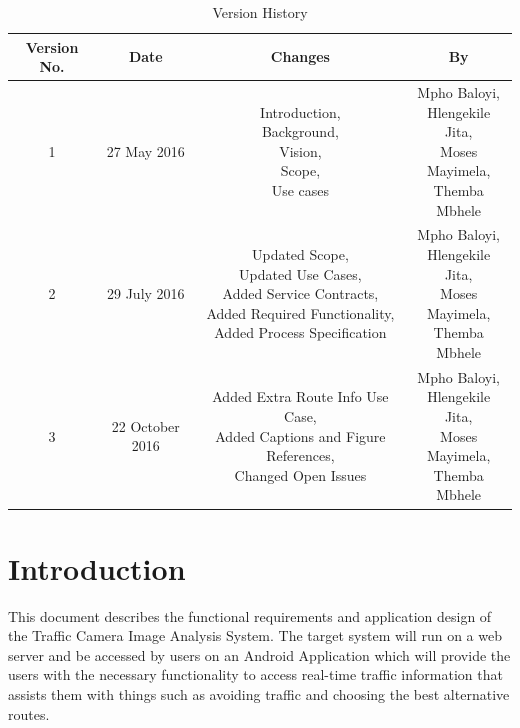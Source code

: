 \documentclass[a4paper,12pt]{article}
\begin{document}
\newpage
\tableofcontents
\newpage

\newpage
\begin{table}[ht]
 \centering
 \caption{Version History}
 \label{tab:table1}
 \begin{tabular}{cccc}
   \toprule Version No. & Date & Changes & By\\
   \midrule 1 & 27 May 2016 & \makecell {Introduction,\\ Background,\\ Vision,\\ Scope,\\ Use cases} & \makecell {Mpho Baloyi,\\ Hlengekile Jita,\\ Moses Mayimela,\\ Themba Mbhele}\\
   2 & 29 July 2016 & \makecell {Updated Scope,\\ Updated Use Cases,\\ Added Service Contracts,\\ Added Required Functionality,\\ Added Process Specification} & \makecell {Mpho Baloyi,\\ Hlengekile Jita,\\ Moses Mayimela,\\ Themba Mbhele} \\
   3 & 22 October 2016 & \makecell {Added Extra Route Info Use Case,\\ Added Captions and Figure References,\\ Changed Open Issues} & \makecell {Mpho Baloyi,\\ Hlengekile Jita,\\ Moses Mayimela,\\ Themba Mbhele} \\
   \bottomrule
  \end{tabular}
\end{table}
\newpage

\section{Introduction}
This document describes the functional requirements and application design of the Traffic Camera Image Analysis System. The target system will run on a web server  and be accessed by users on an Android Application which will provide the users with the necessary functionality to access real-time traffic information that assists them with things such as avoiding traffic and choosing the best alternative routes. 
\end{document}
